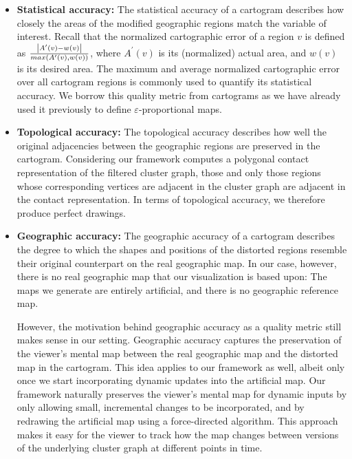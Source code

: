 \begin{itemize}
\item \textbf{Statistical accuracy:}
The statistical accuracy of a cartogram describes how closely the areas of the modified geographic regions match the variable of interest.
Recall that the normalized cartographic error of a region $v$ is defined as $\frac{\left\lvert A^\prime(v)-w(v)\right\rvert}{max(A^\prime(v),w(v))}$, where $A^\prime(v)$ is its (normalized) actual area, and $w(v)$ is its desired area.
The maximum and average normalized cartographic error over all cartogram regions is commonly used to quantify its statistical accuracy.
We borrow this quality metric from cartograms as we have already used it previously to define $\varepsilon$-proportional maps.

\item \textbf{Topological accuracy:}
The topological accuracy describes how well the original adjacencies between the geographic regions are preserved in the cartogram.
Considering our framework computes a polygonal contact representation of the filtered cluster graph, those and only those regions whose corresponding vertices are adjacent in the cluster graph are adjacent in the contact representation.
In terms of topological accuracy, we therefore produce perfect drawings.

\item \textbf{Geographic accuracy:}
The geographic accuracy of a cartogram describes the degree to which the shapes and positions of the distorted regions resemble their original counterpart on the real geographic map.
In our case, however, there is no real geographic map that our visualization is based upon:
The maps we generate are entirely artificial, and there is no geographic reference map.

However, the motivation behind geographic accuracy as a quality metric still makes sense in our setting.
Geographic accuracy captures the preservation of the viewer's mental map between the real geographic map and the distorted map in the cartogram.
This idea applies to our framework as well, albeit only once we start incorporating dynamic updates into the artificial map.
Our framework naturally preserves the viewer's mental map for dynamic inputs by only allowing small, incremental changes to be incorporated, and by redrawing the artificial map using a force-directed algorithm.
This approach makes it easy for the viewer to track how the map changes between versions of the underlying cluster graph at different points in time.
\end{itemize}



